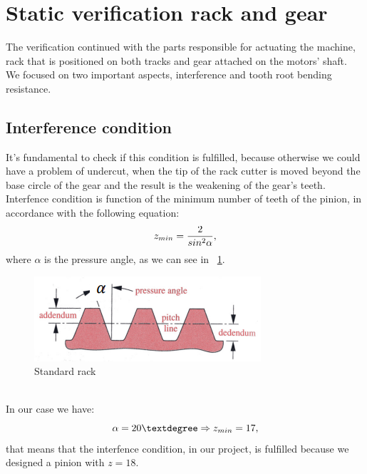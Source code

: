 \section{Static verification rack and gear}
The verification continued with the parts responsible for actuating the machine, rack that is positioned on both tracks and gear attached on the motors' shaft.\\
We focused on two important aspects, interference and tooth root bending resistance.\\

\subsection{Interference condition}
It's fundamental to check if this condition is fulfilled, because otherwise we could have a problem of undercut, when the tip of the rack cutter is moved beyond the base circle of the gear and the result is the weakening of the gear's teeth.\\
Interfence condition is function of the minimum number of teeth of the pinion, in accordance with the following equation:
\begin{equation}
	\centering
	z_{min} = \frac{2}{sin^2\alpha},
\end{equation}
where $\alpha$ is the pressure angle, as we can see in \figurename \ \ref{fig:rack}.
\begin{figure}[hbt]
	\centering
	\includegraphics[scale=1]{Images/rack.png}
	\caption{Standard rack}
	\label{fig:rack}
\end{figure}\\
In our case we have:
\begin{equation*}
	\centering
	\alpha = 20\textdegree \Rightarrow z_{min} = 17,
\end{equation*}
that means that the interfence condition, in our project, is fulfilled because we designed a pinion with $z=18$.\\

